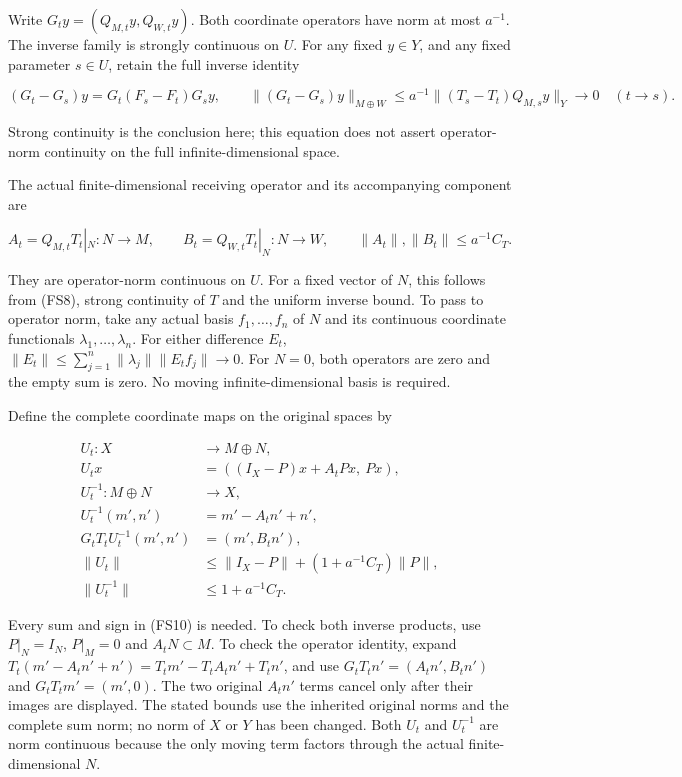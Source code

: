 \documentclass[
  11pt,
]{article}
\begin{document}
Write \(G_ty=(Q_{M,t}y,Q_{W,t}y)\). Both coordinate operators have norm
at most \(a^{-1}\). The inverse family is strongly continuous on \(U\).
For any fixed \(y\in Y\), and any fixed parameter \(s\in U\), retain the
full inverse identity

\[
 (G_t-G_s)y=G_t(F_s-F_t)G_sy,\qquad
 \|(G_t-G_s)y\|_{M\oplus W}
 \leq a^{-1}\|(T_s-T_t)Q_{M,s}y\|_Y\longrightarrow0
 \quad(t\to s).                                               \tag{FS8}
\]

Strong continuity is the conclusion here; this equation does not assert
operator-norm continuity on the full infinite-dimensional space.

The actual finite-dimensional receiving operator and its accompanying
component are

\[
 A_t=Q_{M,t}T_t|_N:N\longrightarrow M,\qquad
 B_t=Q_{W,t}T_t|_N:N\longrightarrow W,
 \qquad \|A_t\|,\|B_t\|\leq a^{-1}C_T.                       \tag{FS9}
\]

They are operator-norm continuous on \(U\). For a fixed vector of \(N\),
this follows from (FS8), strong continuity of \(T\) and the uniform
inverse bound. To pass to operator norm, take any actual basis
\(f_1,\ldots,f_n\) of \(N\) and its continuous coordinate functionals
\(\lambda_1,\ldots,\lambda_n\). For either difference \(E_t\),
\(\|E_t\|\leq\sum_{j=1}^n\|\lambda_j\|\|E_tf_j\|\to0\). For \(N=0\),
both operators are zero and the empty sum is zero. No moving
infinite-dimensional basis is required.

Define the complete coordinate maps on the original spaces by

\[
 \begin{aligned}
 U_t:X&\longrightarrow M\oplus N,\\
 U_tx&=((I_X-P)x+A_tPx,\ Px),\\
 U_t^{-1}:M\oplus N&\longrightarrow X,\\
 U_t^{-1}(m',n')&=m'-A_tn'+n',\\
 G_tT_tU_t^{-1}(m',n')&=(m',B_tn'),\\
 \|U_t\|&\leq\|I_X-P\|+(1+a^{-1}C_T)\|P\|,\\
 \|U_t^{-1}\|&\leq1+a^{-1}C_T.
 \end{aligned}                                                \tag{FS10}
\]

Every sum and sign in (FS10) is needed. To check both inverse products,
use \(P|_N=I_N\), \(P|_M=0\) and \(A_tN\subset M\). To check the
operator identity, expand \(T_t(m'-A_tn'+n')=T_tm'-T_tA_tn'+T_tn'\), and
use \(G_tT_tn'=(A_tn',B_tn')\) and \(G_tT_tm'=(m',0)\). The two original
\(A_tn'\) terms cancel only after their images are displayed. The stated
bounds use the inherited original norms and the complete sum norm; no
norm of \(X\) or \(Y\) has been changed. Both \(U_t\) and \(U_t^{-1}\)
are norm continuous because the only moving term factors through the
actual finite-dimensional \(N\).
\end{document}
